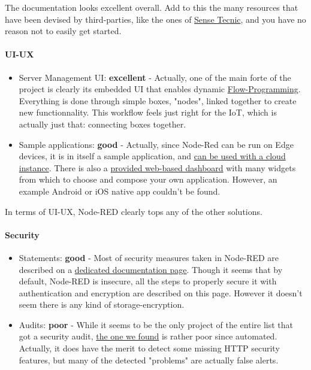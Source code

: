 \documentclass{article}
\begin{document}
The documentation looks excellent overall. Add to this the many resources that have been devised by third-parties, like the ones of \href{http://noderedguide.com/}{Sense Tecnic}, and you have no reason not to easily get started.

\paragraph{UI-UX}

\begin{itemize}
\item Server Management UI: \textbf{excellent} - Actually, one of the main forte of the project is clearly its embedded UI that enables dynamic \href{https://en.wikipedia.org/wiki/Flow-based_programming}{Flow-Programming}. Everything is done through simple boxes, "nodes", linked together to create new functionnality. This workflow feels just right for the IoT, which is actually just that: connecting boxes together.
\item Sample applications: \textbf{good} - Actually, since Node-Red can be run on Edge devices, it is in itself a sample application, and \href{http://developers.sensetecnic.com/article/tutorial-connecting-device-node-red-to-cloud-node-red/}{can be used with a cloud instance}. There is also a \href{https://github.com/node-red/node-red-dashboard}{provided web-based dashboard} with many widgets from which to choose and compose your own application. However, an example Android or iOS native app couldn't be found.
\end{itemize}

In terms of UI-UX, Node-RED clearly tops any of the other solutions.

\paragraph{Security}

\begin{itemize}
\item Statements: \textbf{good} - Most of security measures taken  in Node-RED are described on a \href{https://nodered.org/docs/security}{dedicated documentation page}. Though it seems that by default, Node-RED is insecure, all the steps to properly secure it with authentication and encryption are described on this page. However it doesn't seem there is any kind of storage-encryption.
\item Audits: \textbf{poor} - While it seems to be the only project of the entire list that got a security audit, \href{http://www.isgroup.it/node.security/audit-node-red.html}{the one we found} is rather poor since automated. Actually, it does have the merit to detect some missing HTTP security features, but many of the detected "problems" are actually false alerts.
\end{itemize}
\end{document}
